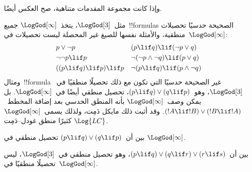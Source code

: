 \documentclass[../../../include/open-logic-section]{subfiles}
\begin{document}
وإذا كانت مجموعة المقدمات متناهية، صح العكس أيضًا.

مثل~$\LogGod[3]$، يتخذ~$\LogGod[\infty]$ جميع~!!{formula}s الصحيحة
حدسيًا تحصيلات منطقية، والأمثلة نفسها للصيغ غير المحصلة ليست تحصيلات
في~$\LogGod[\infty]$:
\begin{align*}
  & p \lor \lnot p && (p \lif q) \lif (\lnot p \lor q) \\
  & \lnot\lnot p \lif p && \lnot(\lnot p \land \lnot q) \lif (p \lor q) \\
  & ((p \lif q) \lif p) \lif p && \lnot(p \lif q) \lif (p \land \lnot q)
\end{align*}
ومثال~!!{formula} غير الصحيحة حدسيًا التي تكون مع ذلك تحصيلًا منطقيًا
في~$\LogGod[3]$، وهو~$(p \lif q) \lor (q \lif p)$، تحصيل منطقي أيضًا
في~$\LogGod[\infty]$. بل يمكن وصف~$\LogGod[\infty]$ بأنه المنطق
الحدسي بعد إضافة المخطط~$(!A \lif !B) \lor (!B \lif !A)$. وقد أثبت
ذلك مايكل دَمِت، ولذلك يسمى~$\LogGod[\infty]$ كثيرًا منطق غودل--دَمِت
$\Log{LC}$.

\begin{prob}
  بين أن~$(p \lif q) \lor (q \lif p)$ تحصيل منطقي في
  $\LogGod[\infty]$.
\end{prob}

\begin{prob}
  بين أن~$(p \lif q) \lor (q \lif r) \lor (r \lif s)$، وهو تحصيل
  منطقي في~$\LogGod[3]$، ليس تحصيلًا منطقيًا في~$\LogGod[\infty]$.
\end{prob}
\end{document}
